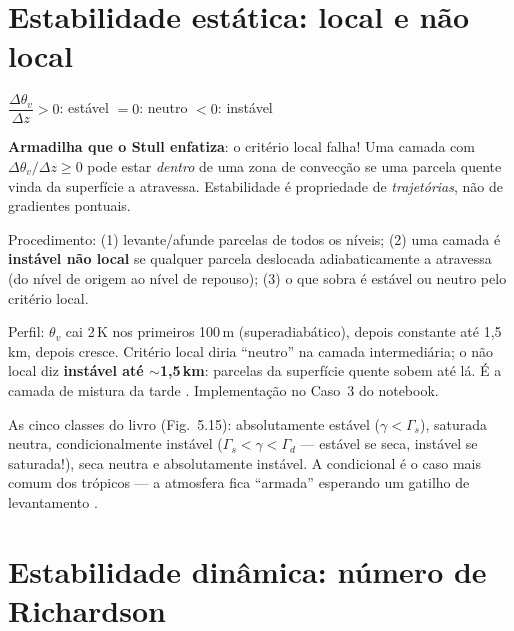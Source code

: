 \documentclass[11pt]{article}
\begin{document}
\section{Estabilidade estática: local e não local}\label{sec:estatica}


\begin{noquadro}
$\dfrac{\Delta\theta_v}{\Delta z} > 0$: estável \qquad $= 0$: neutro
\qquad $< 0$: instável
\end{noquadro}

\textbf{Armadilha que o Stull enfatiza}: o critério local falha! Uma
camada com $\Delta\theta_v/\Delta z \ge 0$ pode estar \emph{dentro} de
uma zona de convecção se uma parcela quente vinda da superfície a
atravessa. Estabilidade é propriedade de \emph{trajetórias}, não de
gradientes pontuais.

\begin{formalivro}
Procedimento: (1) levante/afunde parcelas de todos os níveis;
(2) uma camada é \textbf{instável não local} se qualquer parcela
deslocada adiabaticamente a atravessa (do nível de origem ao nível de
repouso); (3) o que sobra é estável ou neutro pelo critério local.
\end{formalivro}

\begin{exemplo}
Perfil: $\theta_v$ cai 2\,K nos primeiros 100\,m (superadiabático),
depois constante até 1{,}5\,km, depois cresce. Critério local diria
``neutro'' na camada intermediária; o não local diz \textbf{instável até
$\sim$1{,}5\,km}: parcelas da superfície quente sobem até lá. É a camada
de mistura da tarde . Implementação no
Caso~3 do notebook.
\end{exemplo}

As cinco classes do livro (Fig.~5.15): absolutamente estável
($\gamma < \Gamma_s$), saturada neutra, condicionalmente instável
($\Gamma_s < \gamma < \Gamma_d$ — estável se seca, instável se
saturada!), seca neutra e absolutamente instável. A condicional é o caso
mais comum dos trópicos — a atmosfera fica ``armada'' esperando um
gatilho de levantamento .

\section{Estabilidade dinâmica: número de Richardson}\label{sec:ri}
\end{document}
